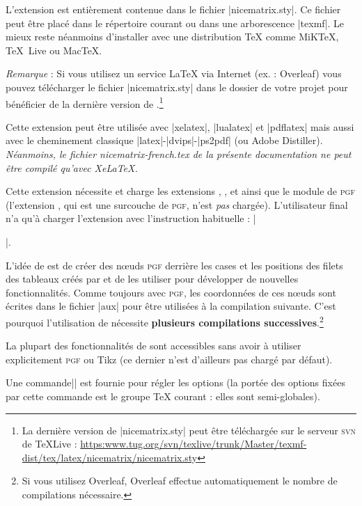 \documentclass[dvipsnames]{article}%
\begin{document}
\vspace{1cm}

L'extension  est entièrement contenue dans le fichier |nicematrix.sty|. Ce fichier peut être placé
dans le répertoire courant ou dans une arborescence |texmf|. Le mieux reste néanmoins d'installer 
avec une distribution TeX comme MiKTeX, TeX~Live ou MacTeX.

\medskip
\emph{Remarque} : Si vous utilisez un service LaTeX via Internet (ex. :
Overleaf) vous pouvez télécharger le fichier |nicematrix.sty| dans le dossier de
votre projet pour bénéficier de la dernière version de
.\footnote{La dernière version de |nicematrix.sty| peut
  être téléchargée sur le serveur \textsc{svn} de TeXLive : \newline \small
  \url{https:www.tug.org/svn/texlive/trunk/Master/texmf-dist/tex/latex/nicematrix/nicematrix.sty}}

\medskip
Cette extension peut être utilisée avec |xelatex|, |lualatex| et |pdflatex| mais
aussi avec le cheminement classique |latex|-|dvips|-|ps2pdf| (ou Adobe
Distiller). \textsl{Néanmoins, le fichier nicematrix-french.tex de la présente
  documentation ne peut être compilé qu'avec XeLaTeX.}

\medskip
Cette extension nécessite et charge les extensions , ,
 et  ainsi que le module  de \textsc{pgf}
(l'extension , qui est une surcouche de \textsc{pgf}, n'est \emph{pas}
chargée). L'utilisateur final n'a qu'à charger l'extension  avec
l'instruction habituelle : |\usepackage{nicematrix}|.


\medskip
L'idée de  est de créer des nœuds \textsc{pgf} derrière les
cases et les positions des filets des tableaux créés par  et de les
utiliser pour développer de nouvelles fonctionnalités. Comme toujours avec
\textsc{pgf}, les coordonnées de ces nœuds sont écrites dans le fichier |aux|
pour être utilisées à la compilation suivante. C'est pourquoi l'utilisation de
 nécessite \textbf{plusieurs compilations
  successives}.\footnote{Si vous utilisez Overleaf, Overleaf effectue
  automatiquement le nombre de compilations nécessaire.}

\medskip
La plupart des fonctionnalités de  sont accessibles sans avoir à
utiliser explicitement \textsc{pgf} ou Tikz (ce dernier n'est d'ailleurs pas
chargé par défaut).

\medskip
Une commande|\NiceMatrixOptions| est fournie pour régler les options (la portée
des options fixées par cette commande est le groupe TeX courant : elles sont
semi-globales).
\end{document}
